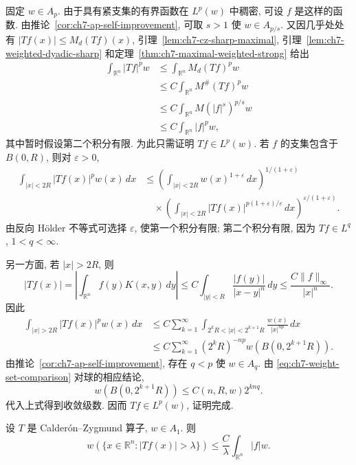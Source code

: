 \begin{Proof}
固定 $w\in A_p$. 由于具有紧支集的有界函数在 $L^p(w)$ 中稠密, 可设 $f$ 是这样的函数. 由推论~\ref{cor:ch7-ap-self-improvement}, 可取 $s>1$ 使 $w\in A_{p/s}$. 又因几乎处处有 $|Tf(x)|\le M_d(Tf)(x)$, 引理~\ref{lem:ch7-cz-sharp-maximal}, 引理~\ref{lem:ch7-weighted-dyadic-sharp} 和定理~\ref{thm:ch7-maximal-weighted-strong} 给出
\[
\begin{aligned}
 \int_{\mathbb R^n}|Tf|^pw
 &\le\int_{\mathbb R^n}M_d(Tf)^pw\\
 &\le C\int_{\mathbb R^n}M^\#(Tf)^pw\\
 &\le C\int_{\mathbb R^n}M(|f|^s)^{p/s}w\\
 &\le C\int_{\mathbb R^n}|f|^pw,
\end{aligned}
\]
其中暂时假设第二个积分有限. 为此只需证明 $Tf\in L^p(w)$. 若 $f$ 的支集包含于 $B(0,R)$, 则对 $\varepsilon>0$,
\[
\begin{aligned}
 \int_{|x|<2R}|Tf(x)|^pw(x)\,dx
 &\le\left(\int_{|x|<2R}w(x)^{1+\varepsilon}\,dx\right)^{1/(1+\varepsilon)}\\
 &\quad\times\left(\int_{|x|<2R}|Tf(x)|^{p(1+\varepsilon)/\varepsilon}\,dx\right)^{\varepsilon/(1+\varepsilon)}.
\end{aligned}
\]
由反向 Hölder 不等式可选择 $\varepsilon$, 使第一个积分有限; 第二个积分有限, 因为 $Tf\in L^q$, $1<q<\infty$.

\hypertarget{chapter-07-page-157}{}
另一方面, 若 $|x|>2R$, 则
\[
 |Tf(x)|=\left|\int_{\mathbb R^n}f(y)K(x,y)\,dy\right|
 \le C\int_{|y|<R}\frac{|f(y)|}{|x-y|^n}\,dy
 \le\frac{C\|f\|_\infty}{|x|^n}.
\]
因此
\[
\begin{aligned}
 \int_{|x|>2R}|Tf(x)|^pw(x)\,dx
 &\le C\sum_{k=1}^\infty
 \int_{2^kR<|x|<2^{k+1}R}\frac{w(x)}{|x|^{np}}\,dx\\
 &\le C\sum_{k=1}^\infty(2^kR)^{-np}w(B(0,2^{k+1}R)).
\end{aligned}
\]
由推论~\ref{cor:ch7-ap-self-improvement}, 存在 $q<p$ 使 $w\in A_q$. 由 \eqref{eq:ch7-weight-set-comparison} 对球的相应结论,
\[
 w(B(0,2^{k+1}R))\le C(n,R,w)2^{knq}.
\]
代入上式得到收敛级数. 因而 $Tf\in L^p(w)$, 证明完成.
\end{Proof}

\begin{Theorem}
\label{thm:ch7-cz-weighted-weak-one}
设 $T$ 是 Calderón--Zygmund 算子, $w\in A_1$. 则
\[
 w(\{x\in\mathbb R^n:|Tf(x)|>\lambda\})
 \le\frac C\lambda\int_{\mathbb R^n}|f|w.
\]
\end{Theorem}

